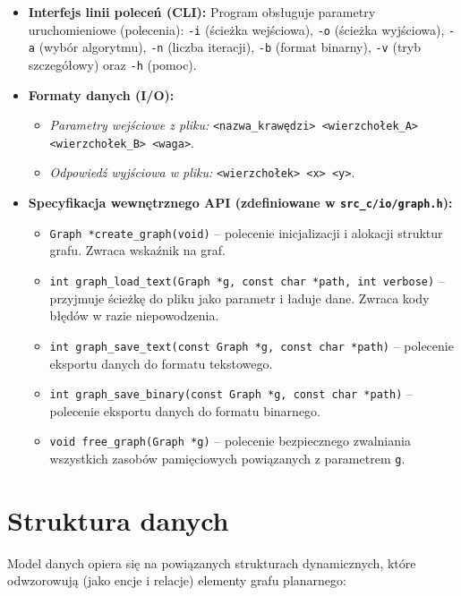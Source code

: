 \documentclass[12pt,a4paper]{article}
\begin{document}
\begin{itemize} 
    \item \textbf{Interfejs linii poleceń (CLI):} Program obsługuje parametry uruchomieniowe (polecenia): \texttt{-i} (ścieżka wejściowa), \texttt{-o} (ścieżka wyjściowa), \texttt{-a} (wybór algorytmu), \texttt{-n} (liczba iteracji), \texttt{-b} (format binarny), \texttt{-v} (tryb szczegółowy) oraz \texttt{-h} (pomoc). 
    \item \textbf{Formaty danych (I/O):}  
    \begin{itemize} 
        \item \textit{Parametry wejściowe z pliku:} \texttt{<nazwa\_krawędzi> <wierzchołek\_A> <wierzchołek\_B> <waga>}. 
        \item \textit{Odpowiedź wyjściowa w pliku:} \texttt{<wierzchołek> <x> <y>}. 
    \end{itemize} 
    \item \textbf{Specyfikacja wewnętrznego API (zdefiniowane w \texttt{src\_c/io/graph.h}):} 
    \begin{itemize} 
        \item \texttt{Graph *create\_graph(void)} -- polecenie inicjalizacji i alokacji struktur grafu. Zwraca wskaźnik na graf. 
        \item \texttt{int graph\_load\_text(Graph *g, const char *path, int verbose)} -- przyjmuje ścieżkę do pliku jako parametr i ładuje dane. Zwraca kody błędów w razie niepowodzenia. 
        \item \texttt{int graph\_save\_text(const Graph *g, const char *path)} -- polecenie eksportu danych do formatu tekstowego. 
        \item \texttt{int graph\_save\_binary(const Graph *g, const char *path)} -- polecenie eksportu danych do formatu binarnego. 
        \item \texttt{void free\_graph(Graph *g)} -- polecenie bezpiecznego zwalniania wszystkich zasobów pamięciowych powiązanych z parametrem \texttt{g}. 
    \end{itemize} 
\end{itemize} 

\newpage 

\section{Struktura danych}

Model danych opiera się na powiązanych strukturach dynamicznych, które odwzorowują (jako encje i relacje) elementy grafu planarnego: 
\end{document}
